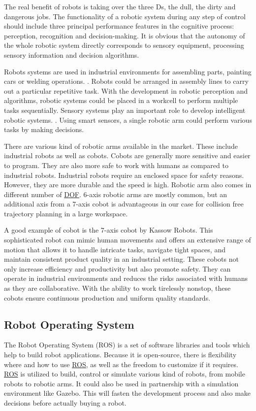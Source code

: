 The real benefit of robots is taking over the three Ds, the dull, the dirty and dangerous jobs. \cite{jordan2016robots}
The functionality of a robotic system during any step of control should include three principal performance
features in the cognitive process: perception, recognition and decision-making. 
It is obvious that the autonomy of the whole robotic system directly corresponds to sensory equipment, 
processing sensory information and decision algorithms. \cite{HAVLIK2011327}

Robots systems are used in industrial environments for assembling parts, painting cars or welding operations. \cite{SathishKumar2023, Wakizako}. Robots could be arranged in assembly lines to carry out a particular repetitive task. With the development in robotic perception and algorithms, robotic systems could be placed in a workcell to perform multiple tasks sequentially.
Sensory systems play an important role to develop intelligent robotic systems. \cite{Wakizako}. Using smart sensors, a single robotic arm could perform various tasks by making decisions.

There are various  kind of robotic arms available in the market. These include industrial robots as well as cobots. Cobots are generally more sensitive and easier to program. They are also more safe to work with humans as compared to industrial robots. Industrial robots require an enclosed space for safety reasons. However, they are more durable and the speed is high. \cite{10201199}
Robotic arm also comes in different number of \hyperref[acro:DOF]{DOF}. 6-axis robotic arms are mostly common, but an additional axis from a 7-axis cobot is advantageous in our case for collision free trajectory planning in a large workspace. 

A good example of cobot is the 7-axis cobot by Kassow Robots. This sophisticated robot can mimic human movements and offers an extensive range of motion that allows it to handle intricate tasks, navigate tight spaces, and maintain consistent product quality in an industrial setting.
These cobots not only increase efficiency and productivity but also promote safety.
They can operate in industrial environments and reduces the risks associated with humans as they are collaborative. 
With the ability to work tirelessly nonstop, these cobots ensure continuous production and uniform quality standards.
\cite{kassowrobotsblog}

\subsection{Robot Operating System}
\label{subsec:ROS}
The Robot Operating System (ROS) is a set of software libraries and tools which help to build robot applications. 
Because it is open-source, there is flexibility where and how to use \hyperref[acro:ROS]{ROS}, as well as the freedom to customize if it requires. \cite{rosblog}
\hyperref[acro:ROS]{ROS} is utilized to build, control or simulate various kind of robots, from mobile robots to robotic arms. \cite{koubaa2017robot}
It could also be used in partnership with a simulation environment like Gazebo. This will fasten the development process
and also make decisions before actually buying a robot. 

